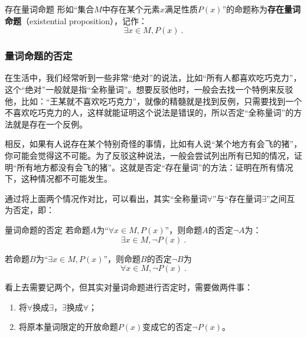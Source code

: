 \begin{definition}{存在量词命题}
形如“集合$M$中存在某个元素$x$满足性质$P(x)$”的命题称为\textbf{存在量词命题}（existential proposition），记作：
\begin{equation}
\exists x\in M,P(x)~.
\end{equation}
\end{definition}

\subsubsection{量词命题的否定}

在生活中，我们经常听到一些非常“绝对”的说法，比如“所有人都喜欢吃巧克力”，这个“绝对”一般就是指“全称量词”。想要反驳他时，一般会去找一个特例来反驳他，比如：“王某就不喜欢吃巧克力”，就像的精髓就是找到反例，只需要找到一个不喜欢吃巧克力的人，这样就能证明这个说法是错误的，所以否定“全称量词”的方法就是存在一个反例。

相反，如果有人说存在某个特别奇怪的事情，比如有人说“某个地方有会飞的猪”，你可能会觉得这不可能。为了反驳这种说法，一般会尝试列出所有已知的情况，证明“所有地方都没有会飞的猪”。这就是否定“存在量词”的方法：证明在所有情况下，这种情况都不可能发生。

通过将上面两个情况作对比，可以看出，其实“全称量词$\forall$”与“存在量词$\exists$”之间互为否定，即：
\begin{theorem}{量词命题的否定}
若命题$A$为“$\forall x\in M,P(x)$”，则命题$A$的否定$\lnot A$为：
\begin{equation}
\exists x\in M,\lnot P(x)~.
\end{equation}

若命题$B$为“$\exists x\in M,P(x)$”，则命题$B$的否定$\lnot B$为
\begin{equation}
\forall x\in M,\lnot P(x)~.
\end{equation}
\end{theorem}

看上去需要记两个，但其实对量词命题进行否定时，需要做两件事：
\begin{enumerate}
\item 将$\forall$换成$\exists$，$\exists$换成$\forall$；
\item 将原本量词限定的开放命题$P(x)$变成它的否定$\lnot P(x)$。
\end{enumerate}


